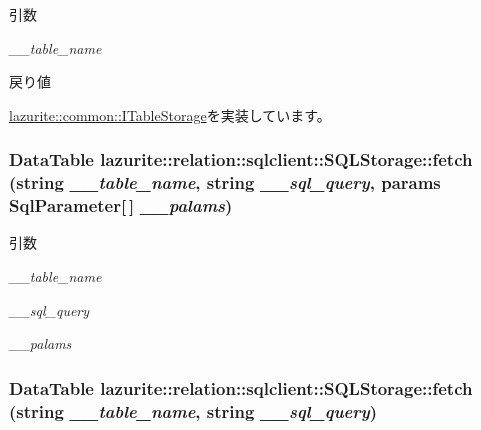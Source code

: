 \begin{DoxyParams}{引数}
\item[{\em \_\-\_\-table\_\-name}]\end{DoxyParams}
\begin{DoxyReturn}{戻り値}

\end{DoxyReturn}


\hyperlink{interfacelazurite_1_1common_1_1_i_table_storage_a2645db3c1b04ecd4e76f00edaf65ba03}{lazurite::common::ITableStorage}を実装しています。\hypertarget{classlazurite_1_1relation_1_1sqlclient_1_1_s_q_l_storage_a7119dd1b3a9d48005c7f44132fb2c0c3}{
\subsubsection[{fetch}]{\setlength{\rightskip}{0pt plus 5cm}DataTable lazurite::relation::sqlclient::SQLStorage::fetch (string {\em \_\-\_\-table\_\-name}, \/  string {\em \_\-\_\-sql\_\-query}, \/  params SqlParameter\mbox{[}$\,$\mbox{]} {\em \_\-\_\-palams})}}
\label{classlazurite_1_1relation_1_1sqlclient_1_1_s_q_l_storage_a7119dd1b3a9d48005c7f44132fb2c0c3}

\begin{DoxyParams}{引数}
\item[{\em \_\-\_\-table\_\-name}]\item[{\em \_\-\_\-sql\_\-query}]\item[{\em \_\-\_\-palams}]\end{DoxyParams}
\hypertarget{classlazurite_1_1relation_1_1sqlclient_1_1_s_q_l_storage_a9c45c2be1c07d8c13d735dfc62a765c3}{
\subsubsection[{fetch}]{\setlength{\rightskip}{0pt plus 5cm}DataTable lazurite::relation::sqlclient::SQLStorage::fetch (string {\em \_\-\_\-table\_\-name}, \/  string {\em \_\-\_\-sql\_\-query})}}
\label{classlazurite_1_1relation_1_1sqlclient_1_1_s_q_l_storage_a9c45c2be1c07d8c13d735dfc62a765c3}


